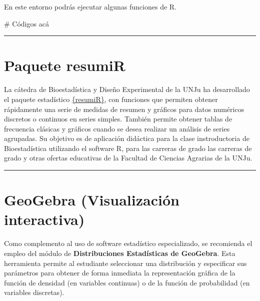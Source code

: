 \documentclass[
  spanish,
  letterpaper,
  DIV=11,
  numbers=noendperiod]{scrreprt}
\newenvironment{Shaded}{\begin{snugshade}}{\end{snugshade}}
\newcommand{\NormalTok}[1]{\textcolor[rgb]{0.00,0.23,0.31}{#1}}
\begin{document}

En este entorno podrás ejecutar algunas funciones de R.

\begin{Shaded}
\begin{Highlighting}[]

\NormalTok{\# Códigos acá}


\end{Highlighting}
\end{Shaded}

\begin{center}\rule{0.5\linewidth}{0.5pt}\end{center}

\section*{Paquete resumiR}\label{paquete-resumir}


La cátedra de Bioestadística y Diseño Experimental de la UNJu ha
desarrollado el paquete estadístico
\href{https://r-packages.io/packages/resumiR}{\{resumiR\}}, con
funciones que permiten obtener rápidamente una serie de medidas de
resumen y gráficos para datos numéricos discretos o continuos en series
simples. También permite obtener tablas de frecuencia clásicas y
gráficos cuando se desea realizar un análisis de series agrupadas. Su
objetivo es de aplicación didáctica para la clase instroductoria de
Bioestadística utilizando el software R, para las carreras de grado las
carreras de grado y otras ofertas educativas de la Facultad de Ciencias
Agrarias de la UNJu.

\begin{center}\rule{0.5\linewidth}{0.5pt}\end{center}

\section*{GeoGebra (Visualización
interactiva)}\label{geogebra-visualizaciuxf3n-interactiva}


Como complemento al uso de software estadístico especializado, se
recomienda el empleo del módulo de \textbf{Distribuciones Estadísticas
de GeoGebra}. Esta herramienta permite al estudiante seleccionar una
distribución y especificar sus parámetros para obtener de forma
inmediata la representación gráfica de la función de densidad (en
variables continuas) o de la función de probabilidad (en variables
discretas).
\end{document}
